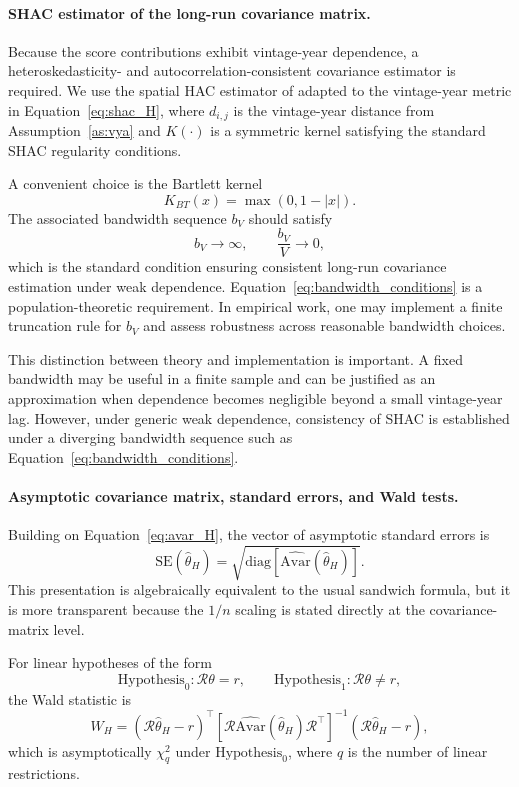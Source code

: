 \paragraph{SHAC estimator of the long-run covariance matrix.}

Because the score contributions exhibit vintage-year dependence, a heteroskedasticity- and autocorrelation-consistent covariance estimator is required. We use the spatial HAC estimator of \cite[Equation 2]{KS11} adapted to the vintage-year metric in Equation~\eqref{eq:shac_H}, where \(d_{i,j}\) is the vintage-year distance from Assumption~\ref{as:vya} and \(K(\cdot)\) is a symmetric kernel satisfying the standard SHAC regularity conditions.

A convenient choice is the Bartlett kernel
\[
K_{BT}(x)
=
\max(0,1-|x|).
\]
The associated bandwidth sequence \(b_V\) should satisfy
\begin{equation}
	\label{eq:bandwidth_conditions}
	b_V \to \infty,
	\qquad
	\frac{b_V}{V} \to 0,
\end{equation}
which is the standard condition ensuring consistent long-run covariance estimation under weak dependence. Equation~\eqref{eq:bandwidth_conditions} is a population-theoretic requirement. In empirical work, one may implement a finite truncation rule for \(b_V\) and assess robustness across reasonable bandwidth choices.

This distinction between theory and implementation is important. A fixed bandwidth may be useful in a finite sample and can be justified as an approximation when dependence becomes negligible beyond a small vintage-year lag. However, under generic weak dependence, consistency of SHAC is established under a diverging bandwidth sequence such as Equation~\eqref{eq:bandwidth_conditions}.

\paragraph{Asymptotic covariance matrix, standard errors, and Wald tests.}

Building on Equation~\eqref{eq:avar_H}, the vector of asymptotic standard errors is
\begin{equation}
	\label{eq:se_H}
	\mathrm{SE}(\hat\theta_H)
	=
	\sqrt{
		\mathrm{diag}
		\left[
		\widehat{\mathrm{Avar}}(\hat\theta_H)
		\right]
	}.
\end{equation}
This presentation is algebraically equivalent to the usual sandwich formula, but it is more transparent because the \(1/n\) scaling is stated directly at the covariance-matrix level.

For linear hypotheses of the form
\[
\text{Hypothesis}_0: \mathcal{R}\theta = r,
\qquad
\text{Hypothesis}_1: \mathcal{R}\theta \neq r,
\]
the Wald statistic is
\begin{equation}
	\label{eq:wald_H}
	W_H
	=
	(\mathcal{R} \hat\theta_H-r)^\top
	\left[
	\mathcal{R}
	\widehat{\mathrm{Avar}}(\hat\theta_H)
	\mathcal{R}^\top
	\right]^{-1}
	(\mathcal{R} \hat\theta_H-r),
\end{equation}
which is asymptotically $\chi_q^2$ under $\text{Hypothesis}_0$, where $q$ is the number of linear restrictions.

